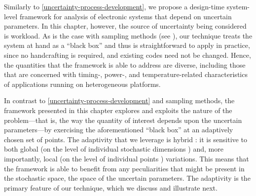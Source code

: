 Similarly to \cref{uncertainty-process-development}, we propose a design-time
system-level framework for analysis of electronic systems that depend on
uncertain parameters. In this chapter, however, the source of uncertainty being
considered is workload. As is the case with sampling methods (see ),
our technique treats the system at hand as a ``black box'' and thus is
straightforward to apply in practice, since no handcrafting is required, and
existing codes need not be changed. Hence, the quantities that the framework is
able to address are diverse, including those that are concerned with timing-,
power-, and temperature-related characteristics of applications running on
heterogeneous platforms.

In contrast to \cref{uncertainty-process-development} and sampling methods, the
framework presented in this chapter explores and exploits the nature of the
problem---that is, the way the quantity of interest depends upon the uncertain
parameters---by exercising the aforementioned ``black box'' at an adaptively
chosen set of points. The adaptivity that we leverage is hybrid
\cite{jakeman2012}: it is sensitive to both global (on the level of individual
stochastic dimensions \cite{klimke2006}) and, more importantly, local (on the
level of individual points \cite{ma2009}) variations. This means that the
framework is able to benefit from any peculiarities that might be present in the
stochastic space, the space of the uncertain parameters. The adaptivity is the
primary feature of our technique, which we discuss and illustrate next.
